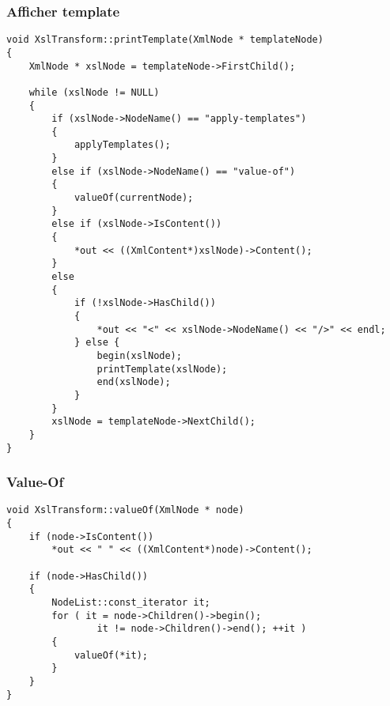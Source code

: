 	\subsubsection {Afficher template}
	\begin{lstlisting} 
void XslTransform::printTemplate(XmlNode * templateNode)
{
	XmlNode * xslNode = templateNode->FirstChild();
	
	while (xslNode != NULL)
	{		
		if (xslNode->NodeName() == "apply-templates")
		{
			applyTemplates();
		}
		else if (xslNode->NodeName() == "value-of")
		{
			valueOf(currentNode);
		}
		else if (xslNode->IsContent())
		{
			*out << ((XmlContent*)xslNode)->Content();
		} 
		else
		{
			if (!xslNode->HasChild())
			{
				*out << "<" << xslNode->NodeName() << "/>" << endl;	
			} else {
				begin(xslNode);
				printTemplate(xslNode);
				end(xslNode);			
			}
		}
		xslNode = templateNode->NextChild();	
	}
}
	\end{lstlisting} 
	
	\subsubsection {Value-Of}
	\begin{lstlisting} 
void XslTransform::valueOf(XmlNode * node)
{
	if (node->IsContent())
		*out << " " << ((XmlContent*)node)->Content();
	
	if (node->HasChild())
	{
		NodeList::const_iterator it;
		for ( it = node->Children()->begin(); 
				it != node->Children()->end(); ++it )
		{
			valueOf(*it);
		}
	}
}
	\end{lstlisting} 
